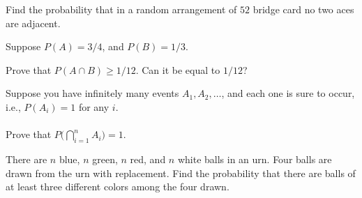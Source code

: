 \begin{problem}[Handout 2, \# 16]
  Find the probability that in a random arrangement of \(52\) bridge card
  no two aces are adjacent.
\end{problem}
\begin{solution}

\end{solution}
\newpage

\begin{problem}[Handout 2, \# 17]
  Suppose \(P(A)=3/4\), and \(P(B)=1/3\).

  Prove that \(P(A\cap B)\geq 1/12\). Can it be equal to \(1/12\)?
\end{problem}
\begin{solution}

\end{solution}
\newpage

\begin{problem}[Handout 2, \# 18]
  Suppose you have infinitely many events \(A_1,A_2,\dotsc\), and each one
  is sure to occur, i.e., \(P(A_i)=1\) for any \(i\).
  \\\\
  Prove that \(P\bigl(\bigcap_{i=1}^n A_i\bigr)=1\).
\end{problem}
\begin{solution}

\end{solution}
\newpage

\begin{problem}[Handout 2, \# 19]
  There are \(n\) blue, \(n\) green, \(n\) red, and \(n\) white balls in an
  urn. Four balls are drawn from the urn with replacement. Find the
  probability that there are balls of at least three different colors among
  the four drawn.
\end{problem}
\begin{solution}

\end{solution}


